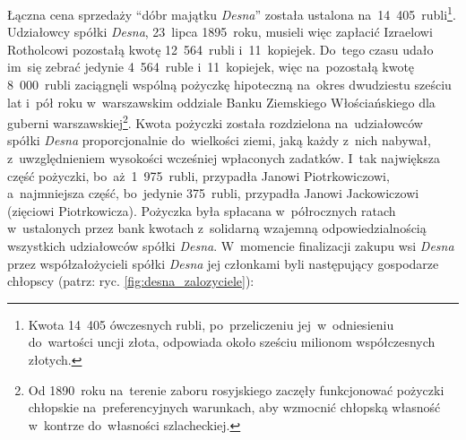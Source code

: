 Łączna cena sprzedaży \enquote{dóbr majątku \emph{Desna}} została ustalona
na~14~405~rubli\footnote{Kwota 14~405 ówczesnych rubli, po~przeliczeniu
jej~w~odniesieniu do~wartości uncji złota, odpowiada około sześciu milionom
współczesnych złotych.}. Udziałowcy spółki \emph{Desna}, 23~lipca 1895~roku,
musieli więc zapłacić Izraelowi Rotholcowi pozostałą kwotę 12~564~rubli
i~11~kopiejek. Do~tego czasu udało im~się zebrać jedynie 4~564~ruble
i~11~kopiejek, więc na~pozostałą kwotę 8~000~rubli zaciągnęli wspólną pożyczkę
hipoteczną na~okres dwudziestu sześciu lat i~pół roku w~warszawskim oddziale
Banku Ziemskiego Włościańskiego dla guberni warszawskiej\footnote{Od 1890~roku
na~terenie zaboru rosyjskiego zaczęły funkcjonować pożyczki chłopskie
na~preferencyjnych warunkach, aby wzmocnić chłopską własność w~kontrze
do~własności szlacheckiej.}. Kwota pożyczki została rozdzielona na~udziałowców
spółki \emph{Desna} proporcjonalnie do~wielkości ziemi, jaką każdy z~nich
nabywał, z~uwzględnieniem wysokości wcześniej wpłaconych zadatków. I~tak
największa część pożyczki, bo~aż~1~975~rubli, przypadła Janowi Piotrkowiczowi,
a~najmniejsza część, bo~jedynie 375~rubli, przypadła Janowi Jackowiczowi
(zięciowi Piotrkowicza). Pożyczka była spłacana w~półrocznych ratach
w~ustalonych przez bank kwotach z~solidarną wzajemną odpowiedzialnością
wszystkich udziałowców spółki \emph{Desna}. W~momencie finalizacji zakupu wsi
\emph{Desna} przez współzałożycieli spółki \emph{Desna} jej członkami byli
następujący gospodarze chłopscy (patrz: ryc. \ref{fig:desna_zalozyciele}):

